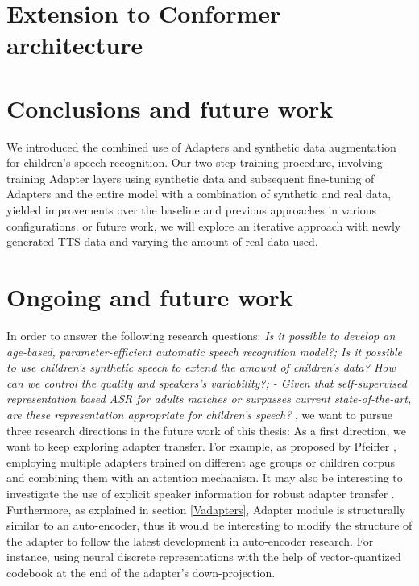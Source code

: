 \section{Extension to Conformer architecture}


\section{Conclusions and future work}
\label{section:conclusions_tts}
We introduced the combined use of Adapters and synthetic data augmentation for children's speech recognition. Our two-step training procedure, involving training Adapter layers %
using synthetic data and subsequent fine-tuning of Adapters and the entire model with a combination of synthetic and real data, yielded improvements over the baseline and previous approaches in various configurations.
or future work, we will explore an iterative approach with newly generated TTS data and varying the amount of real data used.%

\section{Ongoing and future work} %
\label{section:ongoing}
In order to answer the following research questions: \textit{Is it possible to develop an age-based, parameter-efficient automatic speech recognition model?; Is it possible to use children's synthetic speech to extend the amount of children's data? How can we control the quality and speakers’s variability?; - Given that self-supervised representation based ASR for adults matches or surpasses current state-of-the-art, are these representation appropriate for children’s speech? },
we want to pursue three research directions in the future work of this thesis: As a first direction, we want to keep exploring adapter transfer. For example, as proposed by Pfeiffer \cite{pfeiffer2020adapterfusion}, employing multiple adapters trained on different age groups or children corpus and combining them with an attention mechanism. It may also be interesting to investigate the use of explicit speaker information for robust adapter transfer \cite{gong2022layer}. Furthermore, as explained in section \ref{Vadapters}, Adapter module is structurally similar to an auto-encoder, thus it would be interesting to modify the structure of the adapter to follow the latest development in auto-encoder research. For instance, using neural discrete representations with the help of vector-quantized codebook\cite{van2017neural} at the end of the adapter's down-projection.

